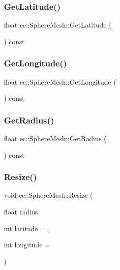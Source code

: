 \subsubsection{\texorpdfstring{Get\+Latitude()}{GetLatitude()}}
{\footnotesize\ttfamily float ec\+::\+Sphere\+Mesh\+::\+Get\+Latitude (\begin{DoxyParamCaption}{ }\end{DoxyParamCaption}) const}

\mbox{\label{classec_1_1_sphere_mesh_af6cc3be0f4584a93dcd3b82e93e48392}} 
\subsubsection{\texorpdfstring{Get\+Longitude()}{GetLongitude()}}
{\footnotesize\ttfamily float ec\+::\+Sphere\+Mesh\+::\+Get\+Longitude (\begin{DoxyParamCaption}{ }\end{DoxyParamCaption}) const}

\mbox{\label{classec_1_1_sphere_mesh_aefa0c1d8caab82b0a36e099e43008032}} 
\subsubsection{\texorpdfstring{Get\+Radius()}{GetRadius()}}
{\footnotesize\ttfamily float ec\+::\+Sphere\+Mesh\+::\+Get\+Radius (\begin{DoxyParamCaption}{ }\end{DoxyParamCaption}) const}

\mbox{\label{classec_1_1_sphere_mesh_a11a1d25477d5e65603efc7fd36a4056c}} 
\subsubsection{\texorpdfstring{Resize()}{Resize()}}
{\footnotesize\ttfamily void ec\+::\+Sphere\+Mesh\+::\+Resize (\begin{DoxyParamCaption}\item[{float}]{radius,  }\item[{int}]{latitude = {},  }\item[{int}]{longitude = {} }\end{DoxyParamCaption})}



